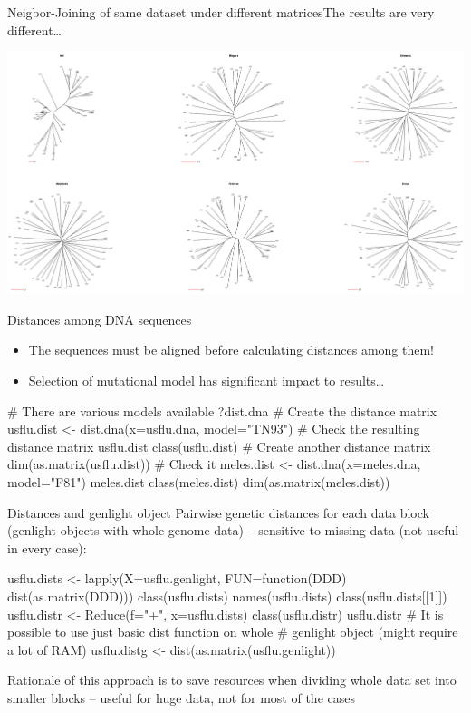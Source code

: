 \documentclass[compress, ucs, xelatex, 11pt, xcolor=svgnames,
  hyperref={
    bookmarks=true,
    unicode=true,
    colorlinks=true,
    pdftitle={Molecular data in R},
    plainpages=false,
    pdfauthor={Vojtech Zeisek},
    pdfsubject={Course about phylogeny and evolution in R},
    pdfcreator={XeLaTeX},
    pdfkeywords={R, evolution, phylogeny, molecular data},
    linkcolor=Tomato,
    anchorcolor=SaddleBrown,
    citecolor=Goldenrod,
    filecolor=DarkMagenta,
    menucolor=Sienna,
    urlcolor=DarkTurquoise,
    pdftex},
  url={hyphens, lowtilde} %
  ]{beamer}
\begin{document}
\begin{frame}{Neigbor-Joining of same dataset under different matrices}{The results are very different\ldots}
  \begin{center}
    \includegraphics[width=\textwidth]{distances.png}
  \end{center}
\end{frame}

\begin{frame}[fragile]{Distances among DNA sequences}
  \begin{itemize}
    \item \alert{The sequences must be aligned before calculating distances among them!}
    \item Selection of mutational model has significant impact to results\ldots
  \end{itemize}
  \vfill
  \begin{spluscode}
    # There are various models available
    ?dist.dna
    # Create the distance matrix
    usflu.dist <- dist.dna(x=usflu.dna, model="TN93")
    # Check the resulting distance matrix
    usflu.dist
    class(usflu.dist)
    # Create another distance matrix
    dim(as.matrix(usflu.dist))
    # Check it
    meles.dist <- dist.dna(x=meles.dna, model="F81")
    meles.dist
    class(meles.dist)
    dim(as.matrix(meles.dist))
  \end{spluscode}
\end{frame}

\begin{frame}[fragile]{Distances and genlight object} %
Pairwise genetic distances for each data block (genlight objects with whole genome data) -- sensitive to missing data (not useful in every case):
\vfill
  \begin{spluscode}
    usflu.dists <- lapply(X=usflu.genlight, FUN=function(DDD)
      dist(as.matrix(DDD)))
    class(usflu.dists)
    names(usflu.dists)
    class(usflu.dists[[1]])
    usflu.distr <- Reduce(f="+", x=usflu.dists)
    class(usflu.distr)
    usflu.distr
    # It is possible to use just basic dist function on whole
    # genlight object (might require a lot of RAM)
    usflu.distg <- dist(as.matrix(usflu.genlight))
  \end{spluscode}
\vfill
Rationale of this approach is to save resources when dividing whole data set into smaller blocks -- useful for huge data, not for most of the cases
\end{frame}
\end{document}
